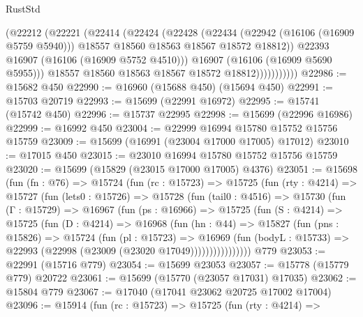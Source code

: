 \begin{lexlean}{RustStd}
\begin{coremodule}
                      (@22212
                        (@22221
                          (@22414
                            (@22424
                              (@22428
                                (@22434
                                  (@22942 (@16106 (@16909 @5759 @5940)))
                                  @18557
                                  @18560
                                  @18563
                                  @18567
                                  @18572
                                  @18812))
                              @22393
                              @16907
                              (@16106 (@16909 @5752 @4510)))
                            @16907
                            (@16106 (@16909 @5690 @5955)))
                          @18557
                          @18560
                          @18563
                          @18567
                          @18572
                          @18812)))))))))))
@22986 := @15682 @450
@22990 := @16960 (@15688 @450) (@15694 @450)
@22991 := @15703 @20719
@22993 := @15699 (@22991 @16972)
@22995 := @15741 (@15742 @450)
@22996 := @15737 @22995
@22998 := @15699 (@22996 @16986)
@22999 := @16992 @450
@23004 := @22999 @16994 @15780 @15752 @15756 @15759
@23009 := @15699 (@16991 (@23004 @17000 @17005) @17012)
@23010 := @17015 @450
@23015 := @23010 @16994 @15780 @15752 @15756 @15759
@23020 := @15699 (@15829 (@23015 @17000 @17005) @4376)
@23051 := @15698
    (fun (fn : @76) =>
    @15724
      (fun (rc : @15723) =>
      @15725
        (fun (rty : @4214) =>
        @15727
          (fun (lets0 : @15726) =>
          @15728
            (fun (tail0 : @4516) =>
            @15730
              (fun (Γ : @15729) =>
              @16967
                (fun (ps : @16966) =>
                @15725
                  (fun (S : @4214) =>
                  @15725
                    (fun (D : @4214) =>
                    @16968
                      (fun (hn : @44) =>
                      @15827
                        (fun (pns : @15826) =>
                        @15724
                          (fun (pl : @15723) =>
                          @16969
                            (fun (bodyL : @15733) =>
                            @22993 (@22998 (@23009 (@23020 @17049))))))))))))))))
    @779
@23053 := @22991 (@15716 @779)
@23054 := @15699 @23053
@23057 := @15778 (@15779 @779) @20722
@23061 := @15699 (@15770 (@23057 @17031) @17035)
@23062 := @15804 @779
@23067 := @17040 (@17041 @23062 @20725 @17002 @17004)
@23096 := @15914
    (fun (rc : @15723) =>
    @15725
      (fun (rty : @4214) =>

\end{coremodule}
\end{lexlean}

